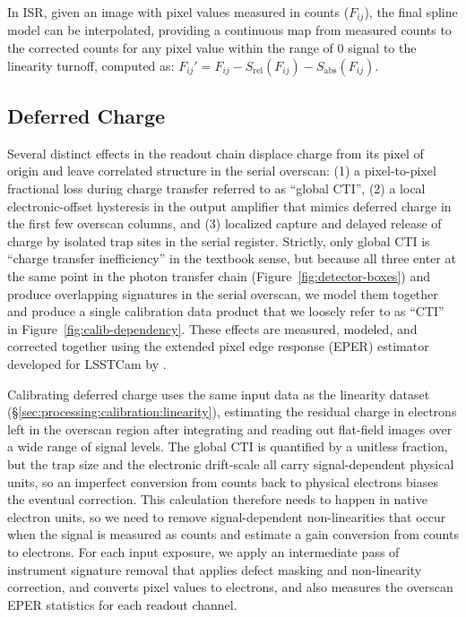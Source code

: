 In ISR, given an image with pixel values measured in counts ($F_{ij}$), the final spline model can be interpolated, providing a continuous map from measured counts to the corrected counts for any pixel value within the range of 0 signal to the linearity turnoff, computed as:
$F_{ij}' = F_{ij} - S_{\mathrm{rel}}(F_{ij}) - S_{\mathrm{abs}}(F_{ij})$.



\subsection{Deferred Charge} \label{sec:processing:calibration:cti}

Several distinct effects in the readout chain displace charge from its pixel of origin and leave correlated structure in the serial overscan: (1) a pixel-to-pixel fractional loss during charge transfer referred to as ``global CTI'', (2) a local electronic-offset hysteresis in the output amplifier that mimics deferred charge in the first few overscan columns, and (3) localized capture and delayed release of charge by isolated trap sites in the serial register.
Strictly, only global CTI is ``charge transfer inefficiency'' in the textbook sense, but because all three enter at the same point in the photon transfer chain (Figure~\ref{fig:detector-boxes}) and produce overlapping signatures in the serial overscan, we model them together and produce a single calibration data product that we loosely refer to as ``CTI'' in Figure~\ref{fig:calib-dependency}.
These effects are measured, modeled, and corrected together using the extended pixel edge response (EPER) estimator developed for LSSTCam by \citet{2021JATIS...7d48002S}.

Calibrating deferred charge uses the same input data as the linearity dataset (\S\ref{sec:processing:calibration:linearity}), estimating the residual charge in electrons left in the overscan region after integrating and reading out flat-field images over a wide range of signal levels.
The global CTI is quantified by a unitless fraction, but the trap size and the electronic drift-scale all carry signal-dependent physical units, so an imperfect conversion from counts back to physical electrons biases the eventual correction.
This calculation therefore needs to happen in native electron units, so we need to remove signal-dependent non-linearities that occur when the signal is measured as counts and estimate a gain conversion from counts to electrons.
For each input exposure, we apply an intermediate pass of instrument signature removal that applies defect masking and non-linearity correction, and converts pixel values to electrons, and also measures the overscan EPER statistics for each readout channel.

